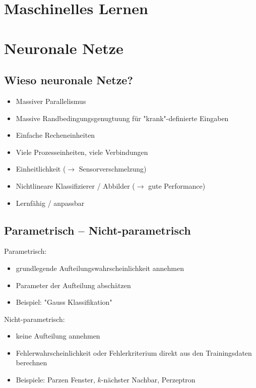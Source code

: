 
\section{Maschinelles Lernen}

\section{Neuronale Netze}

\subsection{Wieso neuronale Netze?}

\begin{itemize}
\item Massiver Parallelismus
\item Massive Randbedingungsgenugtuung für "{}krank"{}-definierte Eingaben
\item Einfache Recheneinheiten
\item Viele Prozesseinheiten, viele Verbindungen
\item Einheitlichkeit ($\to$ Sensorverschmelzung)
\item Nichtlineare Klassifizierer / Abbilder ($\to$ gute Performance)
\item Lernfähig / anpassbar
\end{itemize}

\subsection{Parametrisch -- Nicht-parametrisch}

Parametrisch:
\begin{itemize}
\item grundlegende Aufteilungswahrscheinlichkeit annehmen
\item Parameter der Aufteilung abschätzen
\item Beispiel: "{}Gauss Klassifikation"{}
\end{itemize}
Nicht-parametrisch:
\begin{itemize}
\item keine Aufteilung annehmen
\item Fehlerwahrscheinlichkeit oder Fehlerkriterium direkt aus den Trainingsdaten berechnen
\item Beispiele: Parzen Fenster, $k$-nächster Nachbar, Perzeptron
\end{itemize}


